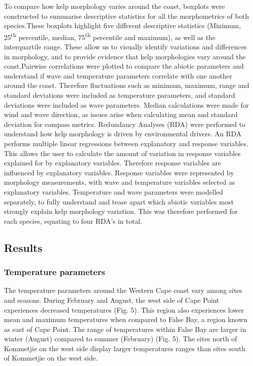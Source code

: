 \documentclass[10pt,a4,]{article}
\begin{document}
To compare how kelp morphology varies around the coast, boxplots were
constructed to summarise descriptive statistics for all the
morphometrics of both species.These boxplots highlight five different
descriptive statistics (Minimum, 25\textsuperscript{th} percentile,
median, 75\textsuperscript{th} percentile and maximum), as well as the
interquartile range. These allow us to visually identify variations and
differences in morphology, and to provide evidence that kelp
morphologies vary around the coast.Pairwise correlations were plotted to
compare the abiotic parameters and understand if wave and temperature
parameters correlate with one another around the coast. Therefore
fluctuations such as minimum, maximum, range and standard deviations
were included as temperature parameters, and standard deviations were
included as wave parameters. Median calculations were made for wind and
wave direction, as issues arise when calculating mean and standard
deviation for compass metrics. Redundancy Analyses (RDA) were performed
to understand how kelp morphology is driven by environmental drivers. An
RDA performs multiple linear regressions between explanatory and
response variables. This allows the user to calculate the amount of
variation in response variables explained for by explanatory variables.
Therefore response variables are influenced by explanatory variables.
Response variables were represented by morphology measurements, with
wave and temperature variables selected as explanatory variables.
Temperature and wave parameters were modelled separately, to fully
understand and tease apart which abiotic variables most strongly explain
kelp morphology variation. This was therefore performed for each
species, equating to four RDA's in total.

\newpage

\hypertarget{results}{%
\subsection{Results}\label{results}}

\hypertarget{temperature-parameters}{%
\subsubsection{Temperature parameters}\label{temperature-parameters}}

The temperature parameters around the Western Cape coast vary among
sites and seasons. During February and August, the west side of Cape
Point experiences decreased temperatures (Fig. 5). This region also
experiences lower mean and maximum temperatures when compared to False
Bay, a region known as east of Cape Point. The range of temperatures
within False Bay are larger in winter (August) compared to summer
(February) (Fig. 5). The sites north of Kommetjie on the west side
display larger temperatures ranges than sites south of Kommetjie on the
west side.
\end{document}
